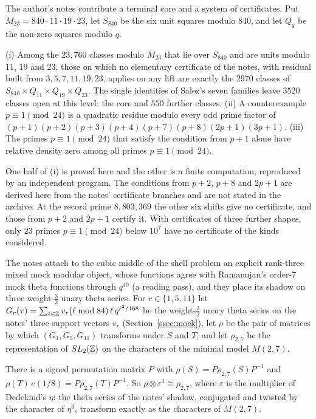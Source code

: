 The author's notes contribute a terminal core and a system of certificates. Put $M_{23}=840\cdot11\cdot19\cdot23$, let $S_{840}$ be the six unit squares modulo $840$, and let $Q_q$ be the non-zero squares modulo $q$.

\begin{introthm}
(i) Among the $23{,}760$ classes modulo $M_{23}$ that lie over $S_{840}$ and are units modulo $11$, $19$ and $23$, those on which no elementary certificate of the notes, with residual built from $3,5,7,11,19,23$, applies on any lift are exactly the $2970$ classes of $S_{840}\times Q_{11}\times Q_{19}\times Q_{23}$. The single identities of Salez's seven families leave $3520$ classes open at this level: the core and $550$ further classes.
(ii) A counterexample $p\equiv1\pmod{24}$ is a quadratic residue modulo every odd prime factor of $(p+1)(p+2)(p+3)(p+4)(p+7)(p+8)(2p+1)(3p+1)$.
(iii) The primes $p\equiv1\pmod{24}$ that satisfy the condition from $p+1$ alone have relative density zero among all primes $p\equiv1\pmod{24}$.
\end{introthm}

One half of (i) is proved here and the other is a finite computation, reproduced by an independent program. The conditions from $p+2$, $p+8$ and $2p+1$ are derived here from the notes' certificate branches and are not stated in the archive. At the record prime $8{,}803{,}369$ the other six shifts give no certificate, and those from $p+2$ and $2p+1$ certify it. With certificates of three further shapes, only $23$ primes $p\equiv1\pmod{24}$ below $10^7$ have no certificate of the kinds considered.

The notes attach to the cubic middle of the shell problem an explicit rank-three mixed mock modular object, whose functions agree with Ramanujan's order-$7$ mock theta functions through $q^{40}$ (a reading pass), and they place its shadow on three weight-$\tfrac32$ unary theta series. For $r\in\{1,5,11\}$ let $G_r(\tau)=\sum_{\ell\in\mathbb{Z}}v_r(\ell\bmod84)\,\ell\,q^{\ell^2/168}$ be the weight-$\tfrac32$ unary theta series on the notes' three support vectors $v_r$ (Section~\ref{ssec:mock}), let $\rho$ be the pair of matrices by which $(G_1,G_5,G_{11})$ transforms under $S$ and $T$, and let $\rho_{2,7}$ be the representation of $SL_2(\mathbb{Z})$ on the characters of the minimal model $M(2,7)$.

\begin{introthm}
There is a signed permutation matrix $P$ with $\overline{\rho(S)}=P\rho_{2,7}(S)P^{-1}$ and $\overline{\rho(T)}\,e(1/8)=P\rho_{2,7}(T)P^{-1}$. So $\bar\rho\otimes\varepsilon^3\cong\rho_{2,7}$, where $\varepsilon$ is the multiplier of Dedekind's $\eta$: the theta series of the notes' shadow, conjugated and twisted by the character of $\eta^3$, transform exactly as the characters of $M(2,7)$.
\end{introthm}


